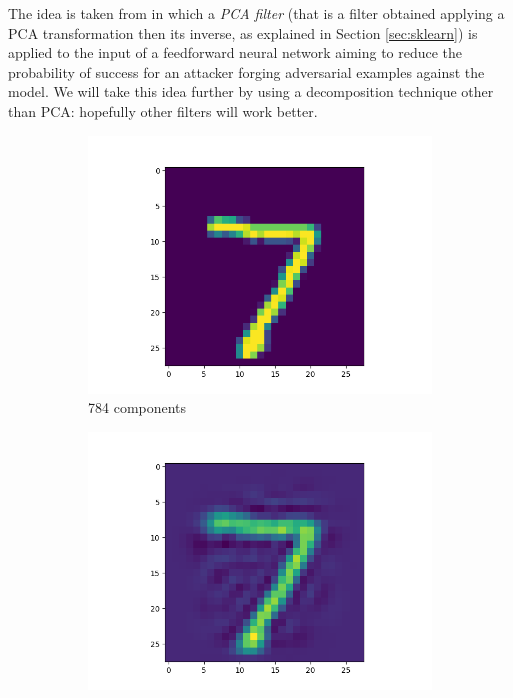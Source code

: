The idea is taken from \cite{bhagoji2018enhancing} in which a \emph{PCA
  filter} (that is a filter obtained applying a PCA transformation then
its inverse, as explained in Section \ref{sec:sklearn}) is applied to
the input of a feedforward neural network aiming to reduce the
probability of success for an attacker forging adversarial examples
against the model. We will take this idea further by using a
decomposition technique other than PCA: hopefully other filters will
work better.

\begin{figure}
  \centering
  \begin{subfigure}{0.3\linewidth}
    \includegraphics[width=\linewidth]{Images/filtered-input-pca-784-components.png}
    \caption{784 components}
  \end{subfigure}
  \begin{subfigure}{0.3\linewidth}
    \includegraphics[width=\linewidth]{Images/filtered-input-pca-100-components.png}

\end{subfigure}
\end{figure}
